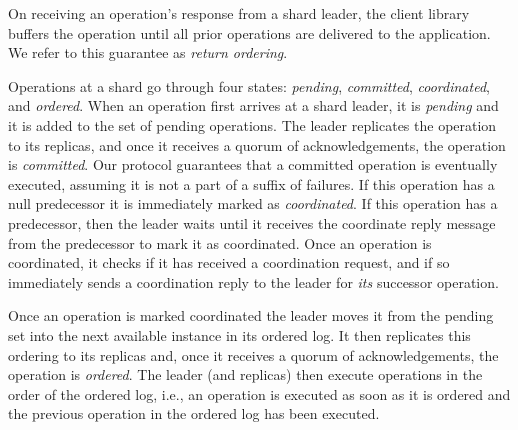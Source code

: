 On receiving an operation's response from a shard leader, the client library buffers the operation until all prior operations are delivered to the application. We refer to this guarantee as \textit{return ordering}.




Operations at a shard go through four states:
\textit{pending},
\textit{committed},
\textit{coordinated},
and
\textit{ordered}.
When an operation first arrives at a shard leader, it is \textit{pending} and it is added to the set of pending operations.
The leader replicates the operation to its replicas, and once it receives a quorum of acknowledgements,
the operation is \textit{committed}.
Our protocol guarantees that a committed operation is eventually executed, assuming it is not a part of a suffix of failures.
If this operation has a null predecessor it is immediately marked as \textit{coordinated}.
If this operation has a predecessor, then the leader waits until it receives the coordinate reply message from the predecessor to mark it as coordinated.
Once an operation is coordinated, it checks if it has received a coordination request, and if so immediately sends a coordination reply to the leader for \textit{its} successor operation.

Once an operation is marked coordinated the leader moves it from the pending set
into the next available instance in its ordered log.  It then replicates this
ordering to its replicas and, once it receives a quorum of acknowledgements, the
operation is \textit{ordered}.
The leader (and replicas) then execute operations in the order of the ordered log, i.e., an operation is executed as soon as it is ordered and the previous operation in the ordered log has been executed.

